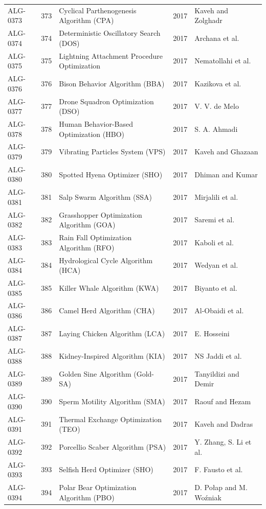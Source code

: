 \documentclass[8pt]{article}
\begin{document}
\begin{landscape}
\begin{longtable}{P{1.7cm}rP{10.0cm}rP{7.2cm}}
ALG-0373 & 373 & Cyclical Parthenogenesis Algorithm (CPA) & 2017 & Kaveh and Zolghadr \\
ALG-0374 & 374 & Deterministic Oscillatory Search (DOS) & 2017 & Archana et al. \\
ALG-0375 & 375 & Lightning Attachment Procedure Optimization & 2017 & Nematollahi et al. \\
ALG-0376 & 376 & Bison Behavior Algorithm (BBA) & 2017 & Kazikova et al. \\
ALG-0377 & 377 & Drone Squadron Optimization (DSO) & 2017 & V. V. de Melo \\
ALG-0378 & 378 & Human Behavior-Based Optimization (HBO) & 2017 & S. A. Ahmadi \\
ALG-0379 & 379 & Vibrating Particles System (VPS) & 2017 & Kaveh and Ghazaan \\
ALG-0380 & 380 & Spotted Hyena Optimizer (SHO) & 2017 & Dhiman and Kumar \\
ALG-0381 & 381 & Salp Swarm Algorithm (SSA) & 2017 & Mirjalili et al. \\
ALG-0382 & 382 & Grasshopper Optimization Algorithm (GOA) & 2017 & Saremi et al. \\
ALG-0383 & 383 & Rain Fall Optimization Algorithm (RFO) & 2017 & Kaboli et al. \\
ALG-0384 & 384 & Hydrological Cycle Algorithm (HCA) & 2017 & Wedyan et al. \\
ALG-0385 & 385 & Killer Whale Algorithm (KWA) & 2017 & Biyanto et al. \\
ALG-0386 & 386 & Camel Herd Algorithm (CHA) & 2017 & Al-Obaidi et al. \\
ALG-0387 & 387 & Laying Chicken Algorithm (LCA) & 2017 & E. Hosseini \\
ALG-0388 & 388 & Kidney-Inspired Algorithm (KIA) & 2017 & NS Jaddi et al. \\
ALG-0389 & 389 & Golden Sine Algorithm (Gold-SA) & 2017 & Tanyildizi and Demir \\
ALG-0390 & 390 & Sperm Motility Algorithm (SMA) & 2017 & Raouf and Hezam \\
ALG-0391 & 391 & Thermal Exchange Optimization (TEO) & 2017 & Kaveh and Dadras \\
ALG-0392 & 392 & Porcellio Scaber Algorithm (PSA) & 2017 & Y. Zhang, S. Li et al. \\
ALG-0393 & 393 & Selfish Herd Optimizer (SHO) & 2017 & F. Fausto et al. \\
ALG-0394 & 394 & Polar Bear Optimization Algorithm (PBO) & 2017 & D. Połap and M. Woźniak \\

\end{longtable}
\end{landscape}
\end{document}
